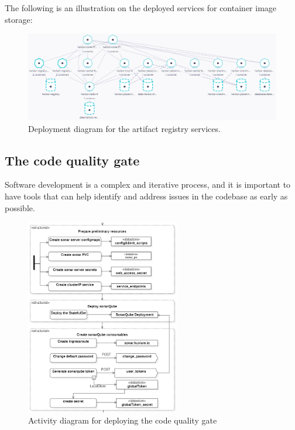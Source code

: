 \hspace{7mm}The following is an illustration on the deployed services for container image storage: 
\begin{figure}[H]\centering
\includegraphics[width=1.0\textwidth,angle=00]{assets/f40.png}
\caption{Deployment diagram for the artifact registry services.}
\label{fig:Deployed services}
\end{figure}

\subsection{The code quality gate}

\hspace{7mm}Software development is a complex and iterative process, and it is important to have tools that can help identify and address issues in the codebase as early as possible. 

\begin{figure}[H]\centering
\includegraphics[width=0.6\textwidth,angle=00]{assets/f41.png}
\caption{Activity diagram for deploying the code quality gate}
\label{fig:Activity diagram for deploying the code quality gate}
\end{figure}

